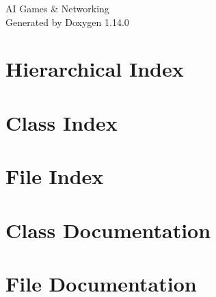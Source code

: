 \documentclass[twoside]{book}
\newcommand{\+}{\discretionary{\mbox{\scriptsize$\hookleftarrow$}}{}{}}
\newcommand{\clearemptydoublepage}{%
    \newpage{\pagestyle{empty}\cleardoublepage}%
  }
\begin{document}
  \raggedbottom
    \hypersetup{pageanchor=false,
                bookmarksnumbered=true,
                pdfencoding=unicode
               }
  \begin{titlepage}
  \vspace*{7cm}
  \begin{center}%
  {\Large AI Games \& Networking}\\
  \vspace*{1cm}
  {\large Generated by Doxygen 1.14.0}\\
  \end{center}
  \end{titlepage}
  \clearemptydoublepage
  \tableofcontents
  \clearemptydoublepage
  \hypersetup{pageanchor=true}
\chapter{Hierarchical Index}

\chapter{Class Index}

\chapter{File Index}

\chapter{Class Documentation}














\chapter{File Documentation}




















  \backmatter
  \newpage
  \clearemptydoublepage
  \printindex
\end{document}

